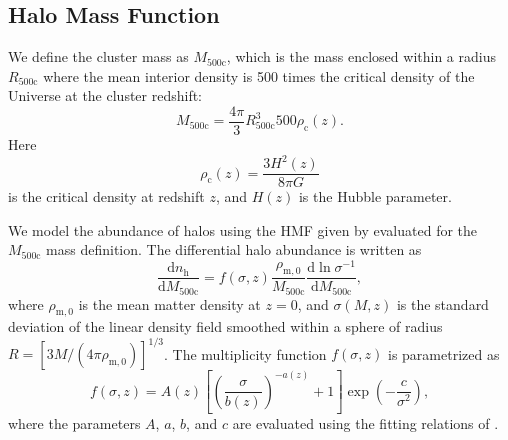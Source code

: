 \documentclass[aps,prd,twocolumn,superscriptaddress,nofootinbib,floatfix]{revtex4-2}
\begin{document}
\subsection{Halo Mass Function}
We define the cluster mass as $M_{500\mathrm{c}}$, which is the mass enclosed within a radius $R_{500\mathrm{c}}$ where the mean interior density is 500 times the critical density of the Universe at the cluster redshift:
\begin{equation}
    M_{500\mathrm{c}}
    =
    \frac{4\pi}{3}
    R_{500\mathrm{c}}^3
    500\rho_{\mathrm{c}}(z).
    \label{eq:m500c_definition}
\end{equation}
Here
\begin{equation}
    \rho_{\mathrm{c}}(z)
    =
    \frac{3H^2(z)}{8\pi G}
    \label{eq:critical_density}
\end{equation}
is the critical density at redshift $z$, and $H(z)$ is the Hubble parameter.

We model the abundance of halos using the HMF given by \citet{Tinker:2008ff} evaluated for the $M_{500\mathrm{c}}$ mass definition.
The differential halo abundance is written as
\begin{equation}
    \frac{\mathrm{d}n_{\mathrm{h}}}{\mathrm{d}M_{500\mathrm{c}}}
    =
    f(\sigma,z)
    \frac{\rho_{\mathrm{m},0}}{M_{500\mathrm{c}}}
    \frac{\mathrm{d}\ln \sigma^{-1}}
    {\mathrm{d}M_{500\mathrm{c}}},
    \label{eq:tinker_hmf}
\end{equation}
where $\rho_{\mathrm{m},0}$ is the mean matter density at $z=0$, and $\sigma(M,z)$ is the standard deviation of the linear density field smoothed within a sphere of radius $R =\left[3M/(4\pi\rho_{\mathrm{m},0})\right]^{1/3}$. The multiplicity function
$f(\sigma,z)$ is parametrized as
\begin{equation}
f(\sigma,z)
=
A(z)
\left[
\left(\frac{\sigma}{b(z)}\right)^{-a(z)}
+ 1
\right]
\exp\left(-\frac{c}{\sigma^2}\right),
\label{eq:tinker_multiplicity}
\end{equation}
where the parameters $A$, $a$, $b$, and $c$ are evaluated using the fitting relations of \citet{Tinker:2008ff}.
\end{document}
